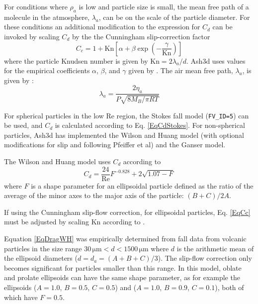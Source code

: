 For conditions where $\rho_a$
is low and particle size is small, the mean free path of a molecule in the
atmosphere, $\lambda_a$, can be on the scale of the particle diameter.  For these
conditions an additional modification to the expression for $C_d$ can
be invoked by scaling $C_d$ by the the Cunningham slip-correction factor
\begin{equation}
C_c = 1+\mathrm{Kn}\left[\alpha+\beta \exp{\left(-\frac{\gamma}{\mathrm{Kn}}\right)} \right]\label{EqCc}
\end{equation}
where the particle Knudsen number is given by $\mathrm{Kn}=2 \lambda_a / d$.
Ash3d uses values for the empirical coefficients $\alpha$, $\beta$, and
$\gamma$ given by \cite[p.407, Eq.9.34]{Seinfeld2006}.
The air mean free path, $\lambda_a$, is given by \cite[p.399, Eq.9.6]{Seinfeld06}:
\begin{equation}
\lambda_a = \frac{2 \eta_a}{P\sqrt{8M_B/\pi R T}}\label{EqLambda}
\end{equation}

For spherical particles in the low $\mathrm{Re}$ region,
the Stokes fall model (\texttt{FV\_ID=5}) can be used, and $C_d$ is calculated
according to Eq. \ref{EqCdStokes}.  For non-spherical particles, Ash3d
has implemented the Wilson and Huang model (with optional modifications for
slip and following Pfeiffer et al) and the Ganser model.

The Wilson and Huang model uses $C_d$ according to
\begin{equation}
C_d = \frac{24}{\mathrm{Re}}F^{-0.828}+2 \sqrt{1.07-F}\label{EqDragWH}
\end{equation}
where $F$ is a shape parameter for an ellipsoidal particle
defined as the ratio of the average of the minor axes to the major axis of
the particle:  $(B+C)/2A$. 

If using the Cunningham slip-flow correction, for ellipsoidal particles,
Eq. \ref{EqCc} must be adjusted by scaling
$\mathrm{Kn}$ according to \cite[Table 1]{Dahneke1973c}.

Equation \ref{EqDragWH} was empirically determined from fall data from volcanic
particles in the size range $30 \, \mathrm{\mu m} < d < 1500 \, \mathrm{\mu m}$
where $d$ is the
arithmetic mean of the ellipsoid diameters ($d=d_a=(A+B+C)/3$).  The slip-flow
correction only becomes significant for particles smaller than this range.
In this model, oblate and prolate ellipsoids can have the same shape parameter,
as for example the ellipsoids ($A=1.0$, $B=0.5$, $C=0.5$) and 
($A=1.0$, $B=0.9$, $C=0.1$), both of which have $F=0.5$.

